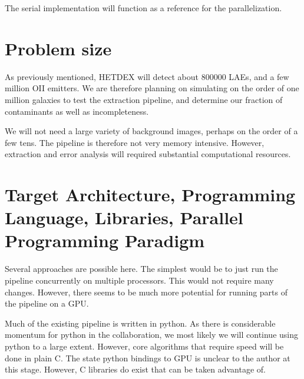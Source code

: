 \documentclass[11pt]{article}
\begin{document}
The serial implementation will function as a reference for the parallelization.


\section{Problem size}

As previously mentioned, HETDEX will detect about \num{800000} LAEs, and a few
million OII emitters. We are therefore planning on simulating on the order of
one million galaxies to test the extraction pipeline, and determine our
fraction of contaminants as well as incompleteness.

We will not need a large variety of background images, perhaps on the order of
a few tens. The pipeline is therefore not very memory intensive. However,
extraction and error analysis will required substantial computational
resources.


\section{Target Architecture, Programming Language, Libraries, Parallel
Programming Paradigm}

Several approaches are possible here. The simplest would be to just run the
pipeline concurrently on multiple processors. This would not require many
changes. However, there seems to be much more potential for running parts of
the pipeline on a GPU.

Much of the existing pipeline is written in python. As there is considerable
momentum for python in the collaboration, we most likely we will continue using
python to a large extent. However, core algorithms that require speed will be
done in plain C. The state python bindings to GPU is unclear to the author at
this stage. However, C libraries do exist that can be taken advantage of.
\end{document}
